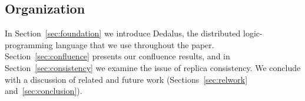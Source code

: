 \subsection{Organization}
In Section~\ref{sec:foundation} we introduce Dedalus, the distributed logic-programming language that we use throughout the paper.  Section~\ref{sec:confluence} presents our confluence results, and in Section~\ref{sec:consistency} we examine the issue of replica consistency.    We conclude with a discussion of related and future work (Sections~\ref{sec:relwork} and~\ref{sec:conclusion}).